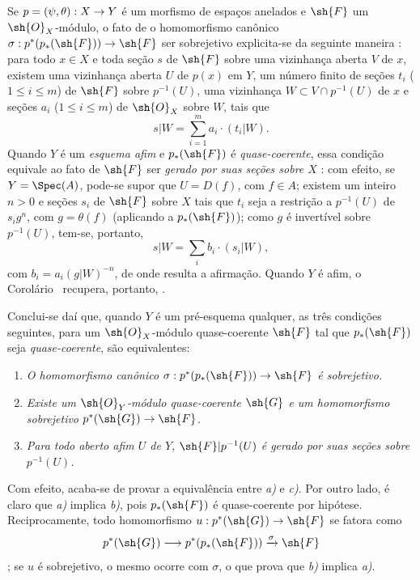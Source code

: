 \documentclass[oneside,10pt]{amsart}
\makeatletter
\renewcommand{\leq}{\leqslant}
\newcommand{\ega@arrow}[2]{\mathchoice{#1}{#2}{#2}{#2}}
\renewcommand{\to}{\ega@arrow{\longrightarrow}{\rightarrow}}
\newcommand{\oldpage}[2][]{\marginnote{\normalfont\footnotesize\textbf{#1}~|~#2}\ignorespaces}
\let\EGAOriginalLabel\label
\renewcommand{\label}[1]{\phantomsection\EGAOriginalLabel{#1}}
\makeatother
\begin{document}
\begin{remarks}[3.4.7]
\label{II.3.4.7}
Se $p=(\psi,\theta):X\to Y$ é um morfismo de espaços anelados e $\sh{F}$ um $\sh{O}_X$-módulo, o fato de o homomorfismo canônico $\sigma:p^*(p_*(\sh{F}))\to\sh{F}$ ser sobrejetivo explicita-se da seguinte maneira : para todo $x\in X$ e toda seção $s$ de $\sh{F}$ sobre uma vizinhança aberta $V$ de $x$, existem uma vizinhança aberta $U$ de $p(x)$ em $Y$, um número finito de seções $t_i$ ($1\leq i\leq m$) de $\sh{F}$ sobre $p^{-1}(U)$, uma vizinhança $W\subset V\cap p^{-1}(U)$ de $x$ e seções $a_i$ ($1\leq i\leq m$) de $\sh{O}_X$ sobre $W$, tais que
\[
  s|W=\sum_{i=1}^m a_i\cdot(t_i|W).
\]
Quando $Y$ é um \emph{esquema afim} e $p_*(\sh{F})$ é \emph{quase-coerente}, essa condição equivale ao fato de $\sh{F}$ ser \emph{gerado por suas seções sobre $X$} : com efeito, se $Y=\Spec(A)$, pode-se supor que $U=D(f)$, com $f\in A$;
existem um inteiro $n>0$ e seções $s_i$ de $\sh{F}$ sobre $X$ tais que $t_i$ seja a restrição a $p^{-1}(U)$ de $s_ig^n$, com $g=\theta(f)$ (aplicando  a $p_*(\sh{F})$);
como $g$ é invertível sobre $p^{-1}(U)$, tem-se, portanto,
\[
  s|W=\sum_i b_i\cdot(s_i|W),
\]
com $b_i=a_i(g|W)^{-n}$, de onde resulta a afirmação.
Quando $Y$ é afim, o Corolário~ recupera, portanto, .

Conclui-se daí que, quando $Y$ é um pré-esquema qualquer, as três condições
\oldpage[II]{61}
seguintes, para um $\sh{O}_X$-módulo quase-coerente $\sh{F}$ tal que $p_*(\sh{F})$ seja \emph{quase-coerente}, são equivalentes:
\begin{enumerate}
  \item[a)] \emph{O homomorfismo canônico $\sigma:p^*(p_*(\sh{F}))\to\sh{F}$ é sobrejetivo.}
  \item[b)] \emph{Existe um $\sh{O}_Y$-módulo quase-coerente $\sh{G}$ e um homomorfismo sobrejetivo $p^*(\sh{G})\to\sh{F}$.}
  \item[c)] \emph{Para todo aberto afim $U$ de $Y$, $\sh{F}|p^{-1}(U)$ é gerado por suas seções sobre $p^{-1}(U)$.}
\end{enumerate}

Com efeito, acaba-se de provar a equivalência entre \emph{a)} e \emph{c)}.
Por outro lado, é claro que \emph{a)} implica \emph{b)}, pois $p_*(\sh{F})$ é quase-coerente por hipótese.
Reciprocamente, todo homomorfismo $u:p^*(\sh{G})\to\sh{F}$ se fatora como
\[
  p^*(\sh{G})\to p^*(p_*(\sh{F}))\xrightarrow{\sigma}\sh{F}
\]
;
se $u$ é sobrejetivo, o mesmo ocorre com $\sigma$, o que prova que \emph{b)} implica \emph{a)}.
\end{remarks}
\end{document}
